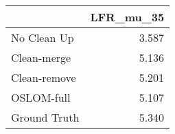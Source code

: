 \begin{tabular}{lr}
\toprule
{} & LFR_mu_35 \\
\midrule
No Clean Up  &     3.587 \\
Clean-merge  &     5.136 \\
Clean-remove &     5.201 \\
OSLOM-full   &     5.107 \\
Ground Truth &     5.340 \\
\bottomrule
\end{tabular}
